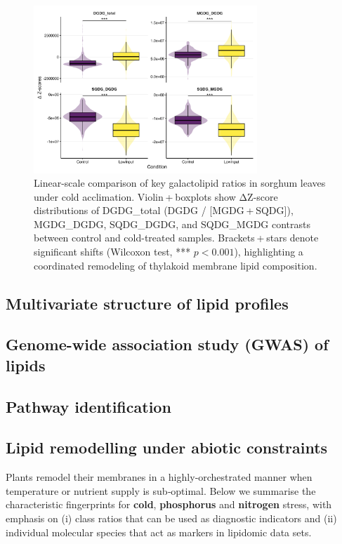 \documentclass[10pt,letterpaper]{article}
\begin{document}
\begin{figure}[htbp]
  \centering
  \includegraphics[width=0.75\textwidth]{fig/main/Fig2c_lipid_ratio_linear_cold.png}
  \caption{Linear-scale comparison of key galactolipid ratios in sorghum leaves under cold acclimation. Violin + boxplots show ΔZ-score distributions of DGDG\_total (DGDG / [MGDG + SQDG]), MGDG\_DGDG, SQDG\_DGDG, and SQDG\_MGDG contrasts between control and cold-treated samples. Brackets + stars denote significant shifts (Wilcoxon test, *** $p<0.001$), highlighting a coordinated remodeling of thylakoid membrane lipid composition.}
  \label{fig:2c_ratio_cold}
\end{figure}


\subsection*{Multivariate structure of lipid profiles}

\subsection*{Genome-wide association study (GWAS) of lipids}

\subsection*{Pathway identification}

\subsection*{Lipid remodelling under abiotic constraints}

Plants remodel their membranes in a highly‐orchestrated manner when temperature or nutrient supply is sub‑optimal.  Below we summarise the characteristic fingerprints for \textbf{cold}, \textbf{phosphorus} and \textbf{nitrogen} stress, with emphasis on (i) class ratios that can be used as diagnostic indicators and (ii) individual molecular species that act as markers in lipidomic data sets.
\end{document}
